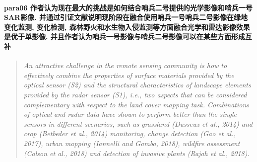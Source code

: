 \paragraph*{para06
    \textcolor[RGB]{17, 205, 29}{作者认为现在最大的挑战是如何结合哨兵二号提供的光学影像和哨兵一号SAR影像. 并通过引证文献说明现阶段在融合使用哨兵一号哨兵二号影像在绿地变化监测, 变化检测, 森林野火和水生物入侵监测等方面融合光学和雷达影像效果是优于单影像. 并且作者认为哨兵一号影像与哨兵二号影像可以在某些方面形成互补}}
\begin{quotation}
    \itshape
    An attractive challenge in the remote sensing community is how to effectively combine the properties of surface materials provided by the optical sensor (S2) and the structural characteristics of landscape elements provided by the radar sensor (S1), i.e., two aspects that can be considered complementary with respect to the land cover mapping task. Combinations of optical and radar data have shown to perform better than the single sensors in different scenarios, such as grassland (Dusseux et al., 2014) and crop (Betbeder et al., 2014) monitoring, change detection (Gao et al., 2017), urban mapping (Iannelli and Gamba, 2018), wildfire assessment (Colson et al., 2018) and detection of invasive plants (Rajah et al., 2018).
\end{quotation}

